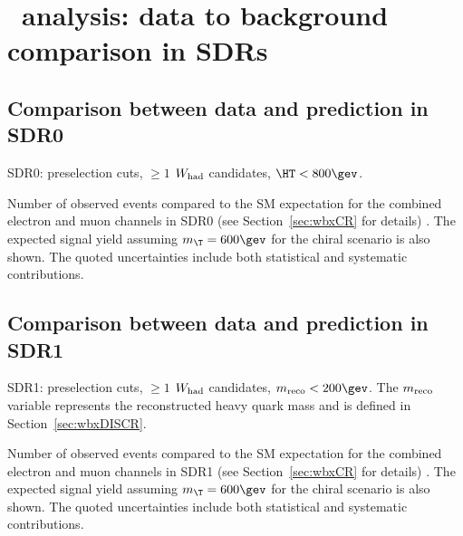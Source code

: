 \clearpage{\pagestyle{empty}\cleardoublepage}

\chapter{\wbx\ analysis: data to background comparison in SDRs}\label{app:wbxSDRs}

\section{Comparison between data and prediction in SDR0}
\label{sec:DataMC_CR0}

SDR0: preselection cuts, $\geq 1$ $W_{\rm had}$ candidates, $\HT<800\gev$. 

\begin{table}[h!]
\begin{center}

\caption{\small{Number of observed events compared to the SM expectation for
the combined electron and muon channels in SDR0 (see Section~\ref{sec:wbxCR} for details) . 
The expected signal yield assuming $m_{\T}=600\gev$ for the chiral scenario is also shown. 
The quoted uncertainties include both statistical and systematic contributions.}}
\label{tab:CR0_1W_evtable}
\end{center}
\end{table}

\clearpage
%


\clearpage

\section{Comparison between data and prediction in SDR1}
\label{sec:DataMC_CR5}

SDR1: preselection cuts, $\geq 1$ $W_{\rm had}$ candidates, $m_{\rm reco}<200\gev$. The $m_{\rm reco}$ variable represents the
reconstructed heavy quark mass and is defined in Section~\ref{sec:wbxDISCR}. 

\begin{table}[h!]
\begin{center}

\caption{\small{Number of observed events compared to the SM expectation for
the combined electron and muon channels in SDR1 (see Section~\ref{sec:wbxCR} for details) . 
The expected signal yield assuming $m_{\T}=600\gev$ for the chiral scenario is also shown. 
The quoted uncertainties include both statistical and systematic contributions.}}
\label{tab:CR5_1W_evtable}
\end{center}
\end{table}

